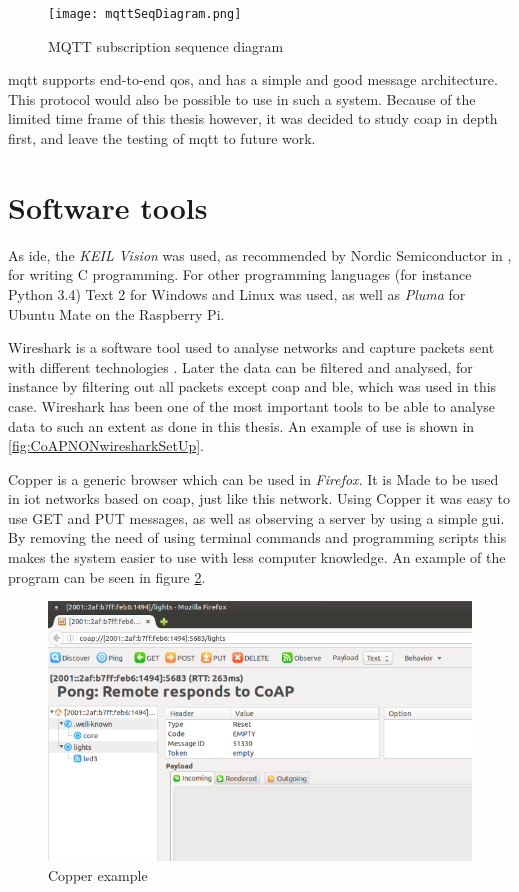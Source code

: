 \begin{figure}[ht]
    \centering
    \texttt{[image: mqttSeqDiagram.png]}    
    \caption{MQTT subscription sequence diagram}
    \label{fig:mqttSeqDiagram}
\end{figure}

\gls{mqtt} supports end-to-end \gls{qos}, and has a simple and good message architecture. This protocol would also be possible to use in such a system. Because of the limited time frame of this thesis however, it was decided to study \gls{coap} in depth first, and leave the testing of \gls{mqtt} to future work. 



\section{Software tools}

As \gls{ide}, the \textit{KEIL Vision} was used, as recommended by Nordic Semiconductor in \cite{nordicSoftwareTools}, for writing C programming. For other programming languages (for instance Python 3.4)  Text 2 for Windows and Linux was used, as well as \textit{Pluma} for Ubuntu Mate on the Raspberry Pi. 

Wireshark is a software tool used to analyse networks and capture packets sent with different technologies \cite{lamping2004wireshark}. Later the data can be filtered and analysed, for instance by filtering out all packets except \gls{coap} and \gls{ble}, which was used in this case. Wireshark has been one of the most important tools to be able to analyse data to such an extent as done in this thesis. An example of use is shown in \ref{fig:CoAPNONwiresharkSetUp}. 

Copper is a generic browser which can be used in \textit{Firefox}. It is Made to be used in \gls{iot} networks based on \gls{coap}, just like this network. Using Copper it was easy to use GET and PUT messages, as well as observing a server by using a simple \gls{gui}. By removing the need of using terminal commands and programming scripts this makes the system easier to use with less computer knowledge. An example of the program can be seen in figure \ref{fig:copperExample}. 
\cite{kovatsch2011demo}

\begin{figure}[ht]
    \centering
    \includegraphics[width=1.0\textwidth]{CopperExample.png}    
    \caption{Copper example}
    \label{fig:copperExample}
\end{figure}

